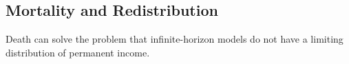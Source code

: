 \documentclass[ProjectDLO]{subfiles}
\begin{document}
\begin{comment}
\hypertarget{Consumption-and-Income-Growth-at-the-Household-Level}{}
\subsection{Identical Growth in Income, Consumption, and Wealth}\label{subsec:cGroEqPGroIndQ}

Unfortunately, the {\GICNrm} condition that we imposed which yielded all of these intuitive propositions at once is rather restrictive.  Modeling experience indicates that it is not always possible to find plausible combinations of parameter values that satisfy that condition.  Furthermore, while the {\GIC} is a considerably looser condition, as noted above (and as

\end{comment}


\hypertarget{Mortality-And-Redistribution}{}
\subsection{Mortality and Redistribution}\label{sec:Mortality-And-Redistribution}

Death can solve the problem that infinite-horizon models do not have a limiting distribution of permanent income.

\hypertarget{Blanchard-Lives}{}
\end{document}
